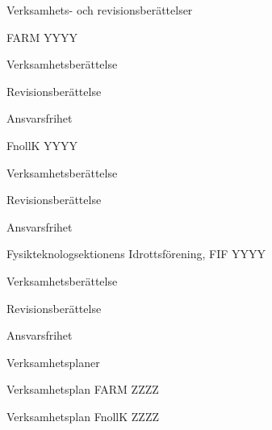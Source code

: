 \documentclass[prelim]{sektionsmote}
\begin{document}
\begin{ootd}
\item{Verksamhets- och revisionsberättelser}
\begin{ootd}
  \item FARM YYYY
  \begin{ootd}
    \item Verksamhetsberättelse
    \item Revisionsberättelse
    \item Ansvarsfrihet
  \end{ootd}
  \item FnollK YYYY
  \begin{ootd}
    \item Verksamhetsberättelse
    \item Revisionsberättelse
    \item Ansvarsfrihet
  \end{ootd}
  \item Fysikteknologsektionens Idrottsförening, FIF YYYY
  \begin{ootd}
    \item Verksamhetsberättelse
    \item Revisionsberättelse
    \item Ansvarsfrihet
  \end{ootd}
\end{ootd}

\item{Verksamhetsplaner}
\begin{ootd}
  \item Verksamhetsplan FARM ZZZZ
  \item Verksamhetsplan FnollK ZZZZ
\end{ootd}



\end{ootd}
\end{document}
